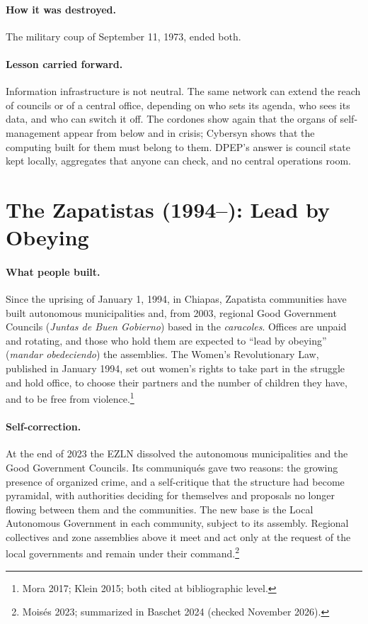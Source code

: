 \documentclass[10pt,twoside,openany]{book}
\theoremstyle{dpepstyle}
\begin{document}
\paragraph{How it was destroyed.} The military coup of September 11, 1973, ended both.

\paragraph{Lesson carried forward.} Information infrastructure is not neutral. The same network can extend the reach of councils or of a central office, depending on who sets its agenda, who sees its data, and who can switch it off. The cordones show again that the organs of self-management appear from below and in crisis; Cybersyn shows that the computing built for them must belong to them. DPEP's answer is council state kept locally, aggregates that anyone can check, and no central operations room.

\section{The Zapatistas (1994--): Lead by Obeying}
\label{sec:hist-zapatistas}

\paragraph{What people built.} Since the uprising of January 1, 1994, in Chiapas, Zapatista communities have built autonomous municipalities and, from 2003, regional Good Government Councils (\emph{Juntas de Buen Gobierno}) based in the \emph{caracoles}. Offices are unpaid and rotating, and those who hold them are expected to ``lead by obeying'' (\emph{mandar obedeciendo}) the assemblies. The Women's Revolutionary Law, published in January 1994, set out women's rights to take part in the struggle and hold office, to choose their partners and the number of children they have, and to be free from violence.\footnote{Mora 2017; Klein 2015; both cited at bibliographic level.}

\paragraph{Self-correction.} At the end of 2023 the EZLN dissolved the autonomous municipalities and the Good Government Councils. Its communiqués gave two reasons: the growing presence of organized crime, and a self-critique that the structure had become pyramidal, with authorities deciding for themselves and proposals no longer flowing between them and the communities. The new base is the Local Autonomous Government in each community, subject to its assembly. Regional collectives and zone assemblies above it meet and act only at the request of the local governments and remain under their command.\footnote{Mois\'es 2023; summarized in Baschet 2024 (checked November 2026).}
\end{document}
